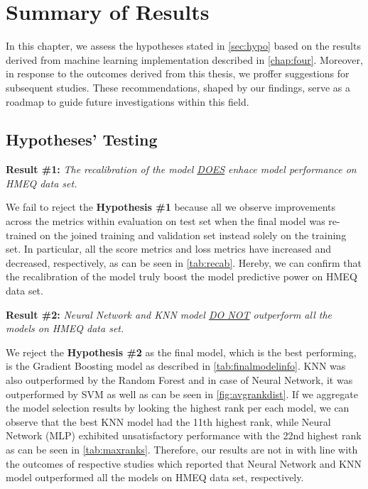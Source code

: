\chapter{Summary of Results}
\label{chap:five}
In this chapter, we assess the hypotheses stated in \autoref{sec:hypo} based on the results derived from machine learning implementation described in \autoref{chap:four}.
Moreover, in response to the outcomes derived from this thesis, we proffer suggestions for subsequent studies. These recommendations, shaped by our findings, serve as a roadmap to guide future investigations within this field.

\section{Hypotheses' Testing}
\noindent \textbf{Result \#1:} \textit{The recalibration of the model \underline{DOES} enhace model performance on HMEQ data set.}

We fail to reject the \textbf{Hypothesis \#1} because all we observe improvements across the metrics within evaluation on test set when the final model was re-trained on the joined training and validation set instead solely on the training set.
In particular, all the score metrics and loss metrics have increased and decreased, respectively, as can be seen in \autoref{tab:recab}. Hereby, we can confirm that the recalibration of the model truly boost the model predictive power on HMEQ data set.

\vspace{0.3cm}

\noindent \textbf{Result \#2:} \textit{Neural Network and KNN model \underline{DO NOT} outperform all the models on HMEQ data set.}

We reject the \textbf{Hypothesis \#2} as the final model, which is the best performing, is the Gradient Boosting model as described in \autoref{tab:finalmodelinfo}.
KNN was also outperformed by the Random Forest and in case of Neural Network, it was outperformed by SVM as well as can be seen in \autoref{fig:avgrankdist}.
If we aggregate the model selection results by looking the highest rank per each model, we can observe that the best KNN model had the 11th highest rank, while Neural Network (MLP) exhibited unsatisfactory performance with the 22nd highest rank as can be seen in \autoref{tab:maxranks}.
Therefore, our results are not in with line with the outcomes of respective studies \citep{serkan2021bagging,zurada2014classification} which reported that Neural Network and KNN model outperformed all the models on HMEQ data set, respectively.

